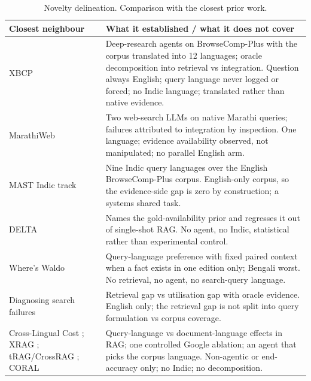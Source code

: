\begin{table}[htbp]
\small
\centering
\begin{tabular}{p{3.6cm}p{9.6cm}}
\toprule
\textbf{Closest neighbour} & \textbf{What it established / what it does not cover} \\
\midrule
XBCP \citep{a2606_15345} & Deep-research agents on BrowseComp-Plus with the corpus translated into 12 languages; oracle decomposition into retrieval vs integration. Question always English; query language never logged or forced; no Indic language; translated rather than native evidence. \\
MarathiWeb \citep{kale2026marathiweb} & Two web-search LLMs on native Marathi queries; failures attributed to integration by inspection. One language; evidence availability observed, not manipulated; no parallel English arm. \\
MAST Indic track \citep{mast2026} & Nine Indic query languages over the English BrowseComp-Plus corpus. English-only corpus, so the evidence-side gap is zero by construction; a systems shared task. \\
DELTA \citep{a2601_02956} & Names the gold-availability prior and regresses it out of single-shot RAG. No agent, no Indic, statistical rather than experimental control. \\
Where's Waldo \citep{a2610_00606} & Query-language preference with fixed paired context when a fact exists in one edition only; Bengali worst. No retrieval, no agent, no search-query language. \\
Diagnosing search failures \citep{a2608_01913} & Retrieval gap vs utilisation gap with oracle evidence. English only; the retrieval gap is not split into query formulation vs corpus coverage. \\
Cross-Lingual Cost \citep{a2507_07543}; XRAG \citep{a2505_10089}; tRAG/CrossRAG \citep{a2504_03616}; CORAL \citep{a2604_25676} & Query-language vs document-language effects in RAG; one controlled Google ablation; an agent that picks the corpus language. Non-agentic or end-accuracy only; no Indic; no decomposition. \\
\bottomrule
\end{tabular}
\caption{Novelty delineation. Comparison with the closest prior work.}
\label{tab:delineation}
\end{table}
